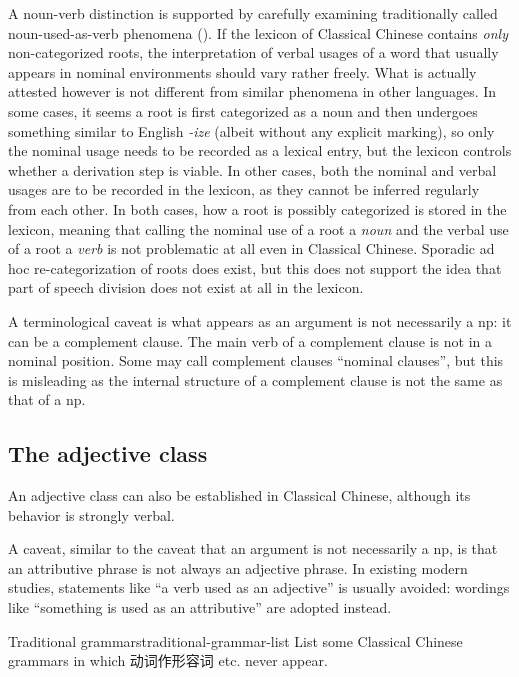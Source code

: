 \documentclass[UTF8, a4paper, oneside, scheme=plain, 12pt]{ctexrep}
\newcommand*{\term}[1]{\emph{#1}}
\newcommand{\form}[1]{\emph{#1}}
\begin{document}
A noun-verb distinction is supported by carefully examining traditionally called noun-used-as-verb phenomena
().
If the lexicon of Classical Chinese contains \emph{only} non-categorized roots,
the interpretation of verbal usages of a word that usually appears in nominal environments
should vary rather freely.
What is actually attested however is not different from similar phenomena in other languages.
In some cases, it seems a root is first categorized as a noun 
and then undergoes something similar to English \form{-ize} (albeit without any explicit marking),
so only the nominal usage needs to be recorded as a lexical entry,
but the lexicon controls whether a derivation step is viable.
In other cases, 
both the nominal and verbal usages are to be recorded in the lexicon,
as they cannot be inferred regularly from each other.
In both cases, how a root is possibly categorized is stored in the lexicon,
meaning that calling the nominal use of a root a \term{noun} and the verbal use of a root a \term{verb}
is not problematic at all even in Classical Chinese.
Sporadic ad hoc re-categorization of roots does exist,
but this does not support the idea that part of speech division does not exist at all in the lexicon.

A terminological caveat is what appears as an argument is not necessarily a \ac{np}:
it can be a complement clause.
The main verb of a complement clause is not in a nominal position.
Some may call complement clauses ``nominal clauses'',
but this is misleading as the internal structure of a complement clause is not the same as that of a \ac{np}.

\subsection{The adjective class}

An adjective class can also be established in Classical Chinese,
although its behavior is strongly verbal. 

A caveat, similar to the caveat that an argument is not necessarily a \ac{np},
is that an attributive phrase is not always an adjective phrase.
In existing modern studies, statements like ``a verb used as an adjective'' is usually avoided:
wordings like ``something is used as an attributive'' are adopted instead.

\begin{todobox}{Traditional grammars}{traditional-grammar-list}
    List some Classical Chinese grammars in which 动词作形容词 etc. never appear.
\end{todobox}
\end{document}
